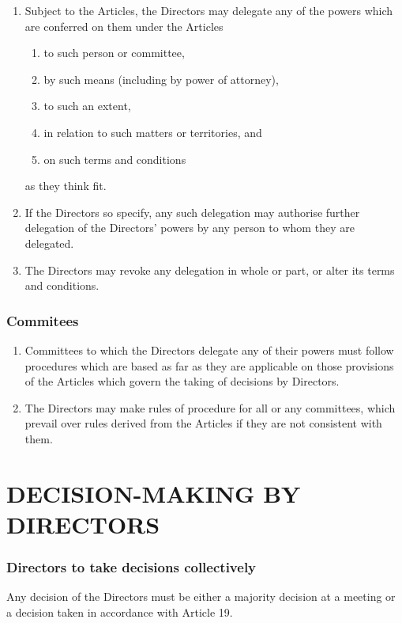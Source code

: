 \documentclass[a4paper,12pt]{article}
\begin{document}
\begin{enumerate}
  \item Subject to the Articles, the Directors may delegate any of the powers which are conferred on them under the Articles
  \begin{enumerate}
    \item to such person or committee,
    \item by such means (including by power of attorney),
    \item to such an extent,
    \item in relation to such matters or territories, and
    \item on such terms and conditions
  \end{enumerate}
  as they think fit.
  \item If the Directors so specify, any such delegation may authorise further delegation of the Directors’ powers by any person to whom they are delegated.
  \item The Directors may revoke any delegation in whole or part, or alter its terms and conditions.
\end{enumerate}

\section{Commitees}

\begin{enumerate}
  \item Committees to which the Directors delegate any of their powers must follow procedures which are based as far as they are applicable on those provisions of the Articles which govern the taking of decisions by Directors.
  \item	The Directors may make rules of procedure for all or any committees, which prevail over rules derived from the Articles if they are not consistent with them.
\end{enumerate}

\part*{DECISION-MAKING BY DIRECTORS}

\section{Directors to take decisions collectively}

Any decision of the Directors must be either a majority decision at a meeting or a decision taken in accordance with Article 19.
\end{document}

